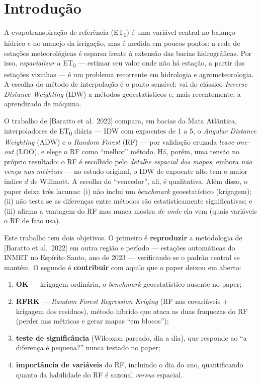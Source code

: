 \section{Introdução}

A evapotranspiração de referência (ET\textsubscript{0}) é uma variável central no
balanço hídrico e no manejo da irrigação, mas é medida em poucos pontos: a rede de
estações meteorológicas é esparsa frente à extensão das bacias hidrográficas. Por
isso, \emph{espacializar} a ET\textsubscript{0} --- estimar seu valor onde não há
estação, a partir das estações vizinhas --- é um problema recorrente em hidrologia
e agrometeorologia. A escolha do método de interpolação é o ponto sensível: vai do
clássico \emph{Inverse Distance Weighting} (IDW) a métodos geoestatísticos e, mais
recentemente, a aprendizado de máquina.

O trabalho de [Baratto et al.\ 2022] compara, em bacias da Mata Atlântica,
interpoladores de ET\textsubscript{0} diária --- IDW com expoentes de 1 a 5, o
\emph{Angular Distance Weighting} (ADW) e o \emph{Random Forest} (RF) --- por
validação cruzada \emph{leave-one-out} (LOO), e elege o RF como ``melhor'' método.
Há, porém, uma tensão no próprio resultado: o RF é escolhido pelo \emph{detalhe
espacial dos mapas}, embora \emph{não vença nas métricas} --- no estudo original, o
IDW de expoente alto tem o maior índice $d$ de Willmott. A escolha do ``vencedor'',
ali, é qualitativa. Além disso, o paper deixa três lacunas: (i) não inclui um
\emph{benchmark} geoestatístico (krigagem); (ii) não testa se as diferenças entre
métodos são estatisticamente significativas; e (iii) afirma a vantagem do RF mas
nunca mostra \emph{de onde} ela vem (quais variáveis o RF de fato usa).

Este trabalho tem dois objetivos. O primeiro é \textbf{reproduzir} a metodologia de
[Baratto et al.\ 2022] em outra região e período --- estações automáticas do INMET
no Espírito Santo, ano de 2023 --- verificando se o padrão central se mantém. O
segundo é \textbf{contribuir} com aquilo que o paper deixou em aberto:

\begin{enumerate}
  \item \textbf{OK} --- krigagem ordinária, o \emph{benchmark} geoestatístico
        ausente no paper;
  \item \textbf{RFRK} --- \emph{Random Forest Regression Kriging} (RF nas
        covariáveis $+$ krigagem dos resíduos), método híbrido que ataca as duas
        fraquezas do RF (perder nas métricas e gerar mapas ``em blocos'');
  \item \textbf{teste de significância} (Wilcoxon pareado, dia a dia), que responde
        ao ``a diferença é pequena?'' nunca testado no paper;
  \item \textbf{importância de variáveis} do RF, incluindo o dia do ano,
        quantificando quanto da habilidade do RF é sazonal \emph{versus} espacial.
\end{enumerate}

